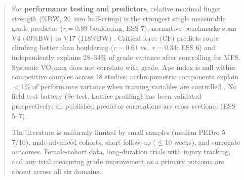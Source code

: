 \begin{abstract}
For \textbf{performance testing and predictors}, relative maximal finger strength (\%BW, 20~mm half-crimp) is the strongest single measurable grade predictor ($r = 0.89$ bouldering, ESS 7); normative benchmarks span V4 (49\%BW) to V17 (118\%BW) \cite{BMK+25}. Critical force (CF) predicts route climbing better than bouldering ($r = 0.61$ vs.\ $r = 0.34$; ESS 6) and independently explains 28--34\% of grade variance after controlling for MFS. Systemic VO$_{2}$max does not correlate with grade. Ape index is null within competitive samples across 18 studies; anthropometric components explain $<$1\% of performance variance when training variables are controlled \cite{MJPS00}. No field test battery (9c test, Lattice profiling) has been validated prospectively; all published predictor correlations are cross-sectional (ESS 5--7).

The literature is uniformly limited by small samples (median PEDro 5--7/10), male-advanced cohorts, short follow-up ($\leq$10 weeks), and surrogate outcomes. Female-cohort data, long-duration trials with injury tracking, and any trial measuring grade improvement as a primary outcome are absent across all six domains.
\end{abstract}
